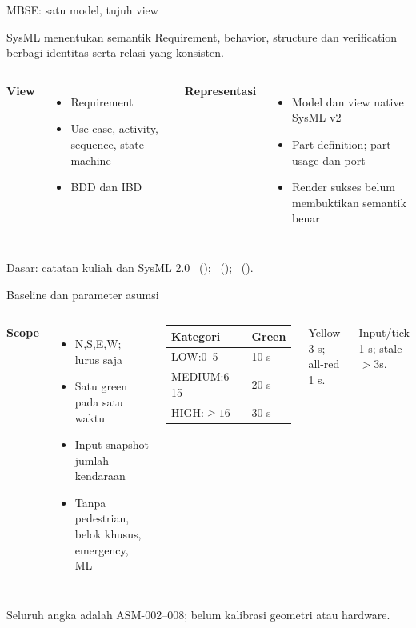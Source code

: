 \documentclass[aspectratio=169,11pt]{beamer}
\begin{document}
\begin{frame}{MBSE: satu model, tujuh view}
\begin{block}{SysML menentukan semantik}
Requirement, behavior, structure dan verification berbagi identitas serta relasi yang konsisten.
\end{block}
\begin{columns}[T]
\textbf{View}
\begin{itemize}\item Requirement\item Use case, activity, sequence, state machine\item BDD dan IBD\end{itemize}
\textbf{Representasi}
\begin{itemize}\item Model dan view native SysML v2\item Part definition; part usage dan port\item Render sukses belum membuktikan semantik benar\end{itemize}
\end{columns}
\vfill\scriptsize Dasar: catatan kuliah dan SysML 2.0 \citeauthor{lecture01}~(\citeyear{lecture01}); \citeauthor{lecture02}~(\citeyear{lecture02}); \citeauthor{omg2026}~(\citeyear{omg2026}).
\end{frame}

\begin{frame}{Baseline dan parameter asumsi}
\begin{columns}[T]
\textbf{Scope}
\begin{itemize}\item N,S,E,W; lurus saja\item Satu green pada satu waktu\item Input snapshot jumlah kendaraan\item Tanpa pedestrian, belok khusus, emergency, ML\end{itemize}
\begin{tabular}{ll}\toprule Kategori & Green \\\midrule LOW:0--5 &10 s\\ MEDIUM:6--15 &20 s\\ HIGH:$\geq 16$ &30 s\\\bottomrule\end{tabular}
\vspace{4mm}\par Yellow 3 s; all-red 1 s.\par Input/tick 1 s; stale$>3$s.
\end{columns}
\vfill\small Seluruh angka adalah ASM-002--008; belum kalibrasi geometri atau hardware.
\end{frame}
\end{document}
